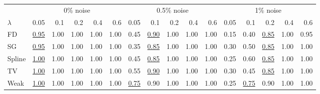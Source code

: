 \begin{tabular}{l|rrrrr|rrrrr|rrrrr}\toprule
 & \multicolumn{5}{c}{0\% noise} & \multicolumn{5}{c}{0.5\% noise} & \multicolumn{5}{c}{1\% noise} \\
$\lambda$ & 0.05 & 0.1 & 0.2 & 0.4 & 0.6 & 0.05 & 0.1 & 0.2 & 0.4 & 0.6 & 0.05 & 0.1 & 0.2 & 0.4 & 0.6 \\\midrule
FD & \underline{0.95} & 1.00 & 1.00 & 1.00 & \colorbox{black!15}{1.00} & 0.45 & \underline{0.90} & 1.00 & 1.00 & \colorbox{black!15}{1.00} & 0.15 & 0.40 & \underline{0.85} & 1.00 & \colorbox{black!15}{0.95} \\
SG & \underline{0.95} & 1.00 & 1.00 & 1.00 & \colorbox{black!15}{1.00} & 0.35 & \underline{0.85} & 1.00 & 1.00 & \colorbox{black!15}{1.00} & 0.30 & 0.50 & \underline{0.85} & 1.00 & \colorbox{black!15}{1.00} \\
Spline & \underline{1.00} & 1.00 & 1.00 & 1.00 & \colorbox{black!15}{1.00} & 0.45 & \underline{0.85} & 1.00 & 1.00 & \colorbox{black!15}{1.00} & 0.25 & 0.60 & \underline{0.85} & 1.00 & \colorbox{black!15}{1.00} \\
TV & \underline{1.00} & 1.00 & 1.00 & 1.00 & \colorbox{black!15}{1.00} & 0.55 & \underline{0.90} & 1.00 & 1.00 & \colorbox{black!15}{1.00} & 0.30 & 0.45 & \underline{0.85} & 1.00 & \colorbox{black!15}{1.00} \\
Weak & \underline{1.00} & 1.00 & 1.00 & 1.00 & \colorbox{black!15}{1.00} & \underline{0.75} & 0.90 & 1.00 & 1.00 & \colorbox{black!15}{1.00} & 0.25 & \underline{0.75} & 0.90 & 1.00 & \colorbox{black!15}{1.00} \\
\bottomrule\end{tabular}
